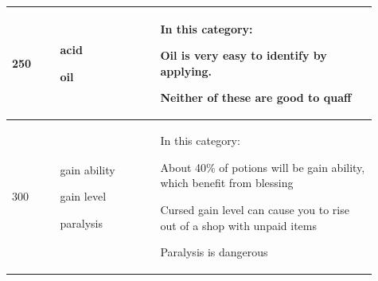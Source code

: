 \begin{longtable}{|>{\RaggedRight}p{0.12120\linewidth}|>{\RaggedRight}p{0.25169\linewidth}|>{\RaggedRight}p{0.54139\linewidth}|}
\hspace*{0pt}\ignorespaces{}\hspace*{0pt}250&\hspace*{0pt}\ignorespaces{}\hspace*{0pt}\begin{myitemize}\item{}acid\footnotemark[162]\item{}oil\footnotemark[163]\end{myitemize}&\hspace*{0pt}\ignorespaces{}\hspace*{0pt}In this category:\begin{myitemize}\item{}Oil is very easy to identify by applying.\item{}Neither of these are good to quaff\end{myitemize}\\ \hline \hspace*{0pt}\ignorespaces{}\hspace*{0pt}300&\hspace*{0pt}\ignorespaces{}\hspace*{0pt}\begin{myitemize}\item{}gain ability\footnotemark[164]\item{}gain level\footnotemark[165]\item{}paralysis\footnotemark[166]\end{myitemize}&\hspace*{0pt}\ignorespaces{}\hspace*{0pt}In this category:\begin{myitemize}\item{}About 40\% of potions will be gain ability, which benefit from blessing\item{}Cursed gain level can cause you to rise out of a shop with unpaid items\item{}Paralysis is dangerous\end{myitemize}\\ \hline 
\end{longtable}

